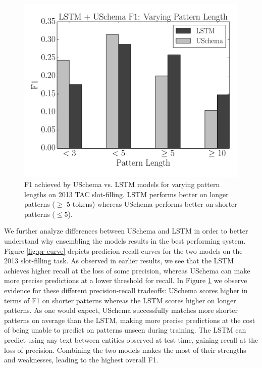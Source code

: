 \begin{figure}[t!]
\begin{center}
\includegraphics[scale=0.45]{f1-vary-pat-length}
\caption{F1 achieved by USchema vs. LSTM models for varying pattern lengths on 2013 TAC slot-filling. LSTM performs better on longer patterns ($\geq$ 5 tokens) whereas USchema performs better on shorter patterns ($\leq 5$). \label{fig:f1-vary-pats}}
\end{center}
\end{figure}

We further analyze differences between USchema and LSTM in order to better understand why ensembling the models results in the best performing system. Figure \ref{fig:pr-curve} depicts predicion-recall curves for the two models on the 2013 slot-filling task. As observed in earlier results, we see that the LSTM achieves higher recall at the loss of some precision, whereas USchema can make more precise predictions at a lower threshold for recall. In Figure \ref{fig:f1-vary-pats} we observe evidence for these different precision-recall tradeoffs: USchema scores higher in terms of F1 on shorter patterns whereas the LSTM scores higher on longer patterns. As one would expect, USchema successfully matches more shorter patterns on average than the LSTM, making more precise predictions at the cost of being unable to predict on patterns unseen during training. The LSTM can predict using any text between entities observed at test time, gaining recall at the loss of precision. Combining the two models makes the most of their strengths and weaknesses, leading to the highest overall F1.


